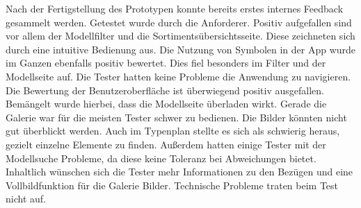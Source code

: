 
Nach der Fertigstellung des Prototypen konnte bereits erstes internes Feedback gesammelt werden. Getestet wurde durch die Anforderer. Positiv aufgefallen sind vor allem der Modellfilter und die Sortimentsübersichtsseite. Diese zeichneten sich durch eine intuitive Bedienung aus. Die Nutzung von Symbolen in der App wurde im Ganzen ebenfalls positiv bewertet. Dies fiel besonders im Filter und der Modellseite auf. Die Tester hatten keine Probleme die Anwendung zu navigieren. Die Bewertung der Benutzeroberfläche ist überwiegend positiv ausgefallen. Bemängelt wurde hierbei, dass die Modellseite überladen wirkt. Gerade die Galerie war für die meisten Tester schwer zu bedienen. Die Bilder könnten nicht gut überblickt werden. Auch im Typenplan stellte es sich als schwierig heraus, gezielt einzelne Elemente zu finden. Außerdem hatten einige Tester mit der Modellsuche Probleme, da diese keine Toleranz bei Abweichungen bietet. Inhaltlich wünschen sich die Tester mehr Informationen zu den Bezügen und eine Vollbildfunktion für die Galerie Bilder. Technische Probleme traten beim Test nicht auf.

\clearpage